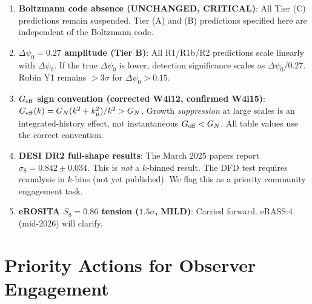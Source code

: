 \documentclass[11pt,a4paper]{article}
\newcommand{\kmu}{k_\mu}
\newcommand{\Geff}{G_{\rm eff}}
\newcommand{\Dpsi}{\Delta\psi}
\begin{document}
\begin{tensionbox}

\begin{enumerate}[nosep]

\item \textbf{Boltzmann code absence (UNCHANGED, CRITICAL)}: All
  Tier (C) predictions remain suspended. Tier (A) and (B) predictions
  specified here are independent of the Boltzmann code.

\item \textbf{$\Dpsi_0 = 0.27$ amplitude (Tier B)}: All R1/R1b/R2
  predictions scale linearly with $\Dpsi_0$. If the true $\Dpsi_0$
  is lower, detection significance scales as $\Dpsi_0 / 0.27$.
  Rubin Y1 remains $> 3\sigma$ for $\Dpsi_0 > 0.15$.

\item \textbf{$\Geff$ sign convention (corrected W4i12, confirmed
  W4i15)}: $\Geff(k) = G_N(k^2 + \kmu^2)/k^2 > G_N$. Growth
  \emph{suppression} at large scales is an integrated-history effect,
  not instantaneous $\Geff < G_N$. All table values use the correct
  convention.

\item \textbf{DESI DR2 full-shape results}: The March 2025 papers
  report $\sigma_8 = 0.842 \pm 0.034$. This is \emph{not} a
  $k$-binned result. The DFD test requires reanalysis in $k$-bins
  (not yet published). We flag this as a priority community
  engagement task.

\item \textbf{eROSITA $S_8 = 0.86$ tension ($1.5\sigma$, MILD)}: Carried
  forward. eRASS:4 (mid-2026) will clarify.

\end{enumerate}

\end{tensionbox}


\section{Priority Actions for Observer Engagement}
\label{sec:actions}
\end{document}
